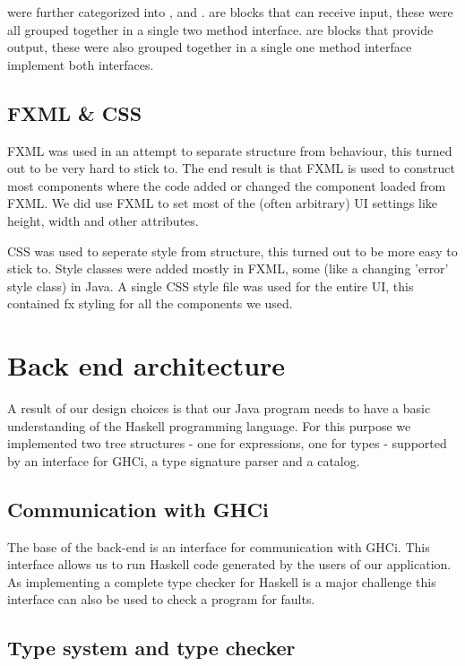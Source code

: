  were further categorized into ,  and .
 are blocks that can receive input, these were all grouped together in a single two method interface.
 are blocks that provide output, these were also grouped together in a single one method interface
 implement both interfaces.

\subsection{FXML \& CSS}
FXML was used in an attempt to separate structure from behaviour, this turned out to be very hard to stick to. The end result is that FXML is used to construct most components where the code added or changed the component loaded from FXML. We did use FXML to set most of the (often arbitrary) UI settings like height, width and other attributes.

CSS was used to seperate style from structure, this turned out to be more easy to stick to. Style classes were added mostly in FXML, some (like a changing 'error' style class) in Java. A single CSS style file was used for the entire UI, this contained fx styling for all the components we used.

\section{Back end architecture}

A result of our design choices is that our Java program needs to have a basic understanding of the Haskell programming
language. For this purpose we implemented two tree structures - one for expressions, one for types - supported by an
interface for GHCi, a type signature parser and a catalog.

\subsection{Communication with GHCi}
\label{GHCi}

The base of the back-end is an interface for communication with GHCi. This interface allows us to run Haskell code
generated by the users of our application. As implementing a complete type checker for Haskell is a major challenge this
interface can also be used to check a program for faults.

\subsection{Type system and type checker}

